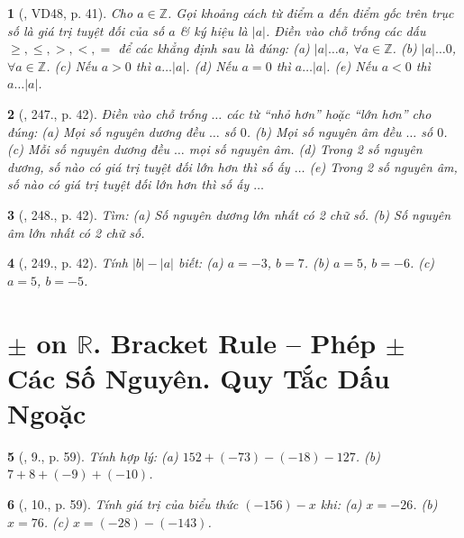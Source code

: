 \documentclass{article}
\newtheorem{baitoan}{}
\begin{document}
\begin{baitoan}[\cite{Binh_Toan_6_tap_1}, VD48, p. 41]
	Cho $a\in\mathbb{Z}$. Gọi khoảng cách từ điểm $a$ đến điểm gốc trên trục số là \emph{giá trị tuyệt đối} của số $a$ \& ký hiệu là $|a|$. Điền vào chỗ trống các dấu $\ge,\le,>,<,=$ để các khẳng định sau là đúng: (a) $|a|\ldots a$, $\forall a\in\mathbb{Z}$. (b) $|a|\ldots 0$, $\forall a\in\mathbb{Z}$. (c) Nếu $a > 0$ thì $a\ldots|a|$. (d) Nếu $a = 0$ thì $a\ldots|a|$. (e) Nếu $a < 0$ thì $a\ldots|a|$.	
\end{baitoan}

\begin{baitoan}[\cite{Binh_Toan_6_tap_1}, 247., p. 42]
	Điền vào chỗ trống $\ldots$ các từ ``nhỏ hơn'' hoặc ``lớn hơn'' cho đúng: (a) Mọi số nguyên dương đều $\ldots$ số $0$. (b) Mọi số nguyên âm đều $\ldots$ số $0$. (c) Mỗi số nguyên dương đều $\ldots$ mọi số nguyên âm. (d) Trong 2 số nguyên dương, số nào có giá trị tuyệt đối lớn hơn thì số ấy $\ldots$ (e) Trong 2 số nguyên âm, số nào có giá trị tuyệt đối lớn hơn thì số ấy $\ldots$	
\end{baitoan}

\begin{baitoan}[\cite{Binh_Toan_6_tap_1}, 248., p. 42]
	Tìm: (a) Số nguyên dương lớn nhất có 2 chữ số. (b) Số nguyên âm lớn nhất có 2 chữ số.	
\end{baitoan}

\begin{baitoan}[\cite{Binh_Toan_6_tap_1}, 249., p. 42]
	Tính $|b| - |a|$ biết: (a) $a = -3$, $b = 7$. (b) $a = 5$, $b = -6$. (c) $a = 5$, $b = -5$.
\end{baitoan}


\section{$\pm$ on $\mathbb{R}$. Bracket Rule -- Phép $\pm$ Các Số Nguyên. Quy Tắc Dấu Ngoặc}

\begin{baitoan}[\cite{Trong_Toan_6_2021}, 9., p. 59]
	Tính hợp lý: (a) $152 + (-73) - (-18) - 127$. (b) $7 + 8 + (-9) + (-10)$.
\end{baitoan}

\begin{baitoan}[\cite{Trong_Toan_6_2021}, 10., p. 59]
	Tính giá trị của biểu thức $(-156) - x$ khi: (a) $x = -26$. (b) $x = 76$. (c) $x = (-28) - (-143)$.
\end{baitoan}
\end{document}
